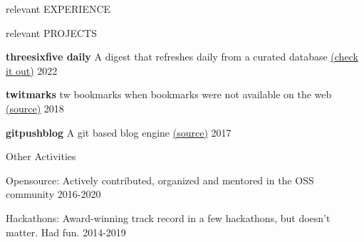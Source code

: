 \documentclass{resume} %
\begin{document}
\begin{rSection}{relevant EXPERIENCE}

\end{rSection}


\begin{rSection}{relevant PROJECTS}
  \vspace{-1.25em}
  \item \textbf{threesixfive daily} {A digest that refreshes daily from a curated database \href{https://daily.threesixfive.shop/}{(check it out)}
  } \hfill 2022
  \item \textbf{twitmarks} {tw bookmarks when bookmarks were not available on the web \href{https://github.com/geekodour/twitmarks}{(source)}
  } \hfill 2018
  \item \textbf{gitpushblog} {A git based blog engine \href{https://github.com/geekodour/gitpushblog}{(source)}} \hfill 2017
\end{rSection}

\begin{rSection}{Other Activities}
  \vspace{-1.25em}
    \item Opensource: Actively contributed, organized and mentored in the OSS community \hfill 2016-2020
    \item Hackathons: Award-winning track record in a few hackathons, but doesn't matter. Had fun. \hfill 2014-2019
\end{rSection}




\end{document}
